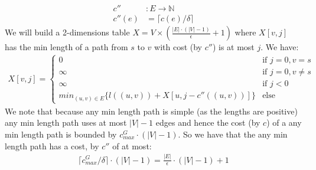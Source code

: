 \documentclass{article}
\begin{document}
\begin{enumerate}
\begin{align*}
c'' &: E \rightarrow \mathbb N\\
c''(e) &= \lceil c(e) / \delta \rceil
\end{align*} 
 We will build a 2-dimensions table $X=V\times (\frac{|E|\cdot (|V|-1)}{\epsilon} +1)$ where $X[v,j]$ has the min length of a path from $s$ to $v$ with cost (by $c''$) is at most $j$. We have:
\begin{align*}
X[v,j] = \begin{cases}
0  & \text{if } j=0,v=s \\
\infty  & \text{if } j=0,v\ne s \\
\infty  & \text{if } j<0 \\
min_{(u,v)\in E} \{ l((u,v)) + X[u,j-c''((u,v))]\}  & \text{else }
\end{cases} \quad 
\end{align*}
We note that because any min length path is simple (as the lengths are positive) any min length path uses at most $|V|-1$ edges and hence the cost (by $c$) of a any min length path is bounded by $c^G_{max}\cdot (|V|-1)$. So we have that the any min length path has a cost, by $c''$ of at most:
\begin{align*}
\lceil c^G_{max} / \delta \rceil \cdot (|V|-1)= \frac{|E|}{\epsilon} \cdot (|V|-1) +1
\end{align*}


\end{enumerate}
\end{document}
